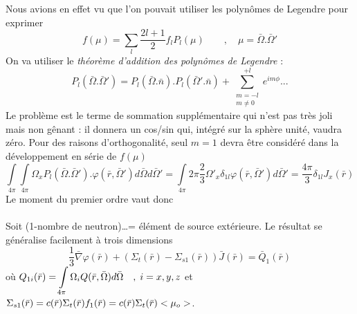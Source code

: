 Nous avions en effet vu que l'on pouvait utiliser les polynômes de Legendre pour exprimer
\begin{equation}
f(\mu ) = \sum\limits_l   \frac{{2l + 1}}{2}{f_l}{P_l}(\mu )\quad \quad ,\quad \mu  = \bar \Omega .\bar \Omega '
\end{equation}
On va utiliser le \textit{théorème d'addition des polynômes de Legendre} : 
\begin{equation}
{P_l}(\bar \Omega .\bar \Omega ') = {P_l}(\bar \Omega .\bar n).{P_l}(\bar \Omega '.\bar n) + \sum\limits_{\begin{array}{*{20}{c}}
{m =  - l}\\
{m \ne 0}
\end{array}}^{ + l}    {e^{im\phi }}...
\end{equation}
Le problème est le terme de sommation supplémentaire qui n'est pas très joli mais non gênant : il 
donnera un cos/sin qui, intégré sur la sphère unité, vaudra zéro. Pour des raisons d'orthogonalité, 
seul $m=1$ devra être considéré dans la développement en série de $f(\mu)$
\begin{equation}
\int\limits_{4\pi }   \int\limits_{4\pi }   {\Omega _x}{P_l}(\bar \Omega .\bar \Omega ').\varphi (\bar r,\bar \Omega ')d\bar \Omega d\bar \Omega ' = \int\limits_{4\pi }   2\pi \frac{2}{3}\Omega {'_x}{\delta _{1l}}\varphi (\bar r,\bar \Omega ')d\bar \Omega ' = \frac{{4\pi }}{3}{\delta _{1l}}{J_x}(\bar r)
\end{equation}
Le moment du premier ordre vaut donc\\

\ \\

Soit (1-nombre de neutron)\dots = élément de source extérieure. Le résultat se généralise facilement
à trois dimensions
\begin{equation}
\frac{1}{3}\bar \nabla \varphi (\bar r) + ({\Sigma _t}(\bar r) - {\Sigma _{s1}}(\bar r))\bar J(\bar r) = {\bar Q_1}(\bar r)
\end{equation}
où $\displaystyle {Q_{1i}}(\bar r) = \int\limits_{4\pi }    {\Omega _i}Q(\bar r,\bar \Omega )d\bar \Omega \quad ,\;i = x,y,z$ et $\displaystyle {\Sigma _{s1}}(\bar r) = c(\bar r){\Sigma _t}(\bar r){f_1}(\bar r) = c(\bar r){\Sigma _t}(\bar r) < {\mu _o} > $.\\

